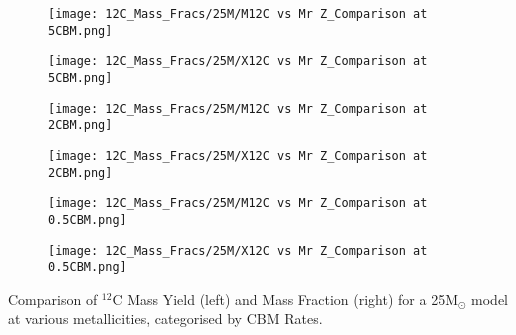 \vspace{1em}
\begin{minipage}{\textwidth}
	\centering
	\begin{subfigure}{0.49\textwidth}
		\texttt{[image: 12C\_Mass\_Fracs/25M/M12C vs Mr Z\_Comparison at 5CBM.png]}
	\end{subfigure}
        \hfill
	\begin{subfigure}{0.49\textwidth}
		\texttt{[image: 12C\_Mass\_Fracs/25M/X12C vs Mr Z\_Comparison at 5CBM.png]}
	\end{subfigure}
        \label{fig:12C_25M_5CBM}
\end{minipage}
\begin{minipage}{\textwidth}
	\centering
	\begin{subfigure}{0.49\textwidth}
		\texttt{[image: 12C\_Mass\_Fracs/25M/M12C vs Mr Z\_Comparison at 2CBM.png]}
	\end{subfigure}
        \hfill
	\begin{subfigure}{0.49\textwidth}
		\texttt{[image: 12C\_Mass\_Fracs/25M/X12C vs Mr Z\_Comparison at 2CBM.png]}
	\end{subfigure}
        \label{fig:12C_25M_2CBM}
\end{minipage}
\begin{minipage}{\textwidth}
	\centering
	\begin{subfigure}{0.49\textwidth}
		\texttt{[image: 12C\_Mass\_Fracs/25M/M12C vs Mr Z\_Comparison at 0.5CBM.png]}
	\end{subfigure}
        \hfill
	\begin{subfigure}{0.49\textwidth}
		\texttt{[image: 12C\_Mass\_Fracs/25M/X12C vs Mr Z\_Comparison at 0.5CBM.png]}
	\end{subfigure}
	 \caption{Comparison of $^{12}$C Mass Yield (left) and Mass Fraction (right) for a 25M$_\odot$ model at various metallicities, categorised by CBM Rates.}
        \label{fig:12C_25M_0.5CBM}
\end{minipage}


